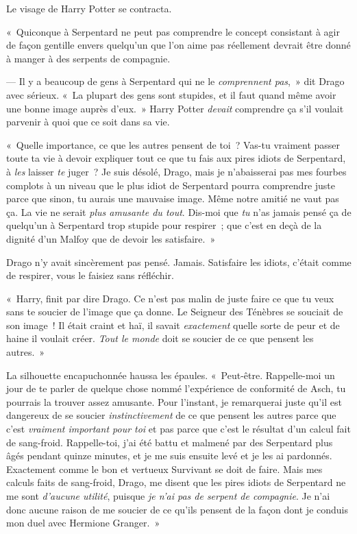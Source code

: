 Le visage de Harry Potter se contracta.

«~Quiconque à Serpentard ne peut pas comprendre le concept consistant à agir de façon gentille envers quelqu'un que l'on aime pas réellement devrait être donné à manger à des serpents de compagnie.

--- Il y a beaucoup de gens à Serpentard qui ne le \emph{comprennent pas},~» dit Drago avec sérieux.
«~La plupart des gens sont stupides, et il faut quand même avoir une bonne image auprès d'eux.~»
Harry Potter \emph{devait} comprendre ça s'il voulait parvenir à quoi que ce soit dans sa vie.

«~Quelle importance, ce que les autres pensent de toi~?
Vas-tu vraiment passer toute ta vie à devoir expliquer tout ce que tu fais aux pires idiots de Serpentard, à \emph{les} laisser \emph{te} juger~?
Je suis désolé, Drago, mais je n'abaisserai pas mes fourbes complots à un niveau que le plus idiot de Serpentard pourra comprendre juste parce que sinon, tu aurais une mauvaise image.
Même notre amitié ne vaut pas ça.
La vie ne serait \emph{plus amusante du tout}.
Dis-moi que \emph{tu} n'as jamais pensé ça de quelqu'un à Serpentard trop stupide pour respirer~; que c'est en deçà de la dignité d'un Malfoy que de devoir les satisfaire.~»

Drago n'y avait sincèrement pas pensé.
Jamais. Satisfaire les idiots, c'était comme de respirer, vous le faisiez sans réfléchir.

«~Harry, finit par dire Drago.
Ce n'est pas malin de juste faire ce que tu veux sans te soucier de l'image que ça donne.
Le Seigneur des Ténèbres se souciait de son image~!
Il était craint et haï, il savait \emph{exactement} quelle sorte de peur et de haine il voulait créer.
\emph{Tout le monde} doit se soucier de ce que pensent les autres.~»

La silhouette encapuchonnée haussa les épaules.
«~Peut-être.
Rappelle-moi un jour de te parler de quelque chose nommé l'expérience de conformité de Asch, tu pourrais la trouver assez amusante.
Pour l'instant, je remarquerai juste qu'il est dangereux de se soucier \emph{instinctivement} de ce que pensent les autres parce que c'est \emph{vraiment important pour toi} et pas parce que c'est le résultat d'un calcul fait de sang-froid.
Rappelle-toi, j'ai été battu et malmené par des Serpentard plus âgés pendant quinze minutes, et je me suis ensuite levé et je les ai pardonnés.
Exactement comme le bon et vertueux Survivant se doit de faire.
Mais mes calculs faits de sang-froid, Drago, me disent que les pires idiots de Serpentard ne me sont \emph{d'aucune utilité}, puisque \emph{je n'ai pas de serpent de compagnie}.
Je n'ai donc aucune raison de me soucier de ce qu'ils pensent de la façon dont je conduis mon duel avec Hermione Granger.~»

